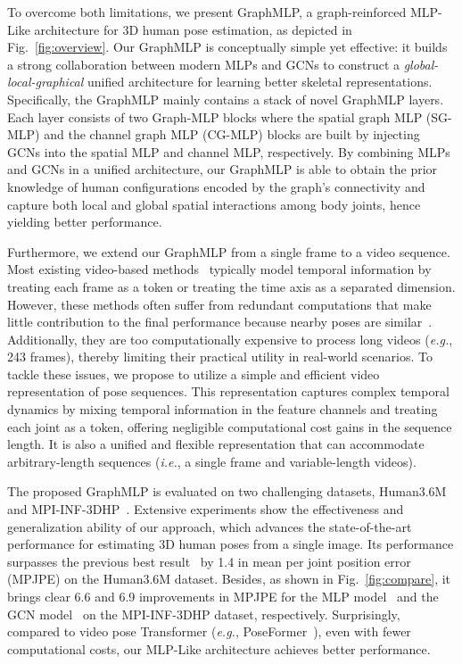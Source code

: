 \documentclass[lettersize,journal]{IEEEtran}
\begin{document}
To overcome both limitations, we present GraphMLP, a graph-reinforced MLP-Like architecture for 3D human pose estimation, as depicted in Fig.~\ref{fig:overview}. 
Our GraphMLP is conceptually simple yet effective: it builds a strong collaboration between modern MLPs and GCNs to construct a \textit{global-local-graphical} unified architecture for learning better skeletal representations. 
Specifically, the GraphMLP mainly contains a stack of novel GraphMLP layers. 
Each layer consists of two Graph-MLP blocks where the spatial graph MLP (SG-MLP) and the channel graph MLP (CG-MLP) blocks are built by injecting GCNs into the spatial MLP and channel MLP, respectively. 
By combining MLPs and GCNs in a unified architecture, our GraphMLP is able to obtain the prior knowledge of human configurations encoded by the graph’s connectivity and capture both local and global spatial interactions among body joints, hence yielding better performance.

Furthermore, we extend our GraphMLP from a single frame to a video sequence. 
Most existing video-based methods~\cite{videopose,poseformer,mhformer} typically model temporal information by treating each frame as a token or treating the time axis as a separated dimension. 
However, these methods often suffer from redundant computations that make little contribution to the final performance because nearby poses are similar~\cite{strided}.
Additionally, they are too computationally expensive to process long videos (\emph{e.g.}, 243 frames), thereby limiting their practical utility in real-world scenarios. 
To tackle these issues, we propose to utilize a simple and efficient video representation of pose sequences.  
This representation captures complex temporal dynamics by mixing temporal information in the feature channels and treating each joint as a token, offering negligible computational cost gains in the sequence length. 
It is also a unified and flexible representation that can accommodate arbitrary-length sequences (\emph{i.e.}, a single frame and variable-length videos). 

The proposed GraphMLP is evaluated on two challenging datasets, Human3.6M~\cite{ionescu2013human3} and MPI-INF-3DHP~\cite{mehta2017monocular}. 
Extensive experiments show the effectiveness and generalization ability of our approach, which advances the state-of-the-art performance for estimating 3D human poses from a single image.  
Its performance surpasses the previous best result~\cite{zou2021modulated} by 1.4  in mean per joint position error (MPJPE) on the Human3.6M dataset. 
Besides, as shown in Fig.~\ref{fig:compare}, it brings clear 6.6  and 6.9  improvements in MPJPE for the MLP model~\cite{mlpmixer} and the GCN model~\cite{stgcn} on the MPI-INF-3DHP dataset, respectively. 
Surprisingly, compared to video pose Transformer (\emph{e.g.}, PoseFormer~\cite{poseformer}), even with  fewer computational costs, our MLP-Like architecture achieves better performance. 
\end{document}
